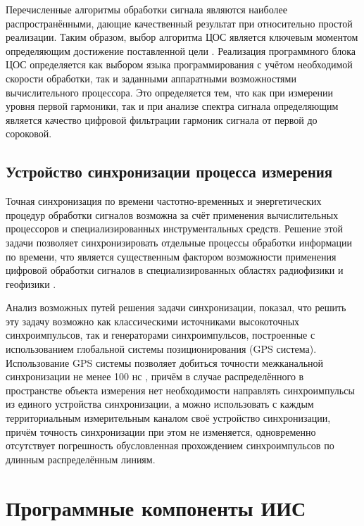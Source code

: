 \documentclass[a4paper, 14pt, titlepage]{extarticle}
\let\oldsection\section
\renewcommand{\section}{\newpage\oldsection}
\begin{document}
  Перечисленные алгоритмы обработки сигнала являются наиболее распространёнными, дающие качественный
  результат при относительно простой реализации. Таким образом, выбор алгоритма ЦОС является
  ключевым моментом определяющим достижение поставленной цели \cite{zubarev-realtime}. Реализация
  программного блока ЦОС определяется как выбором языка программирования с учётом необходимой
  скорости обработки, так и заданными аппаратными возможностями вычислительного процессора. Это
  определяется тем, что как при измерении уровня первой гармоники, так и при анализе спектра сигнала
  определяющим является качество цифровой фильтрации гармоник сигнала от первой до сороковой.

  \subsection{Устройство синхронизации процесса измерения}\label{ssec:sync}

  Точная синхронизация по времени частотно-временных и энергетических процедур обработки
  сигналов возможна за счёт применения вычислительных процессоров и специализированных
  инструментальных средств. Решение этой задачи позволяет синхронизировать отдельные процессы
  обработки информации по времени, что является существенным фактором возможности применения
  цифровой обработки сигналов в специализированных областях радиофизики и геофизики \cite{rathore-digital}.


  Анализ возможных путей решения задачи синхронизации, показал, что решить эту задачу возможно как
  классическими источниками высокоточных синхроимпульсов, так и генераторами синхроимпульсов,
  построенные с использованием глобальной системы позиционирования (GPS система). Использование GPS
  системы позволяет добиться точности межканальной синхронизации не менее 100 нс \cite{lombardi-gps}, причём в случае
  распределённого в пространстве объекта измерения нет необходимости направлять синхроимпульсы из
  единого устройства синхронизации, а можно использовать с каждым территориальным измерительным
  каналом своё устройство синхронизации, причём точность синхронизации при этом не изменяется,
  одновременно отсутствует погрешность обусловленная прохождением синхроимпульсов по длинным
  распределённым линиям.

  \section{Программные компоненты ИИС}
\end{document}
